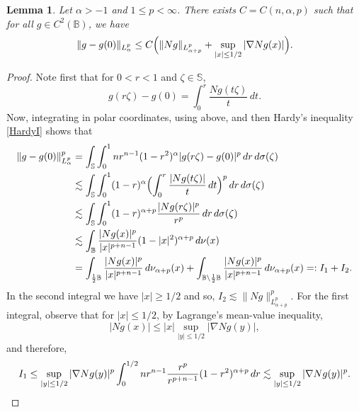 \documentclass{amsart}
\newtheorem{lemma}[theorem]{Lemma}
\theoremstyle{definition}
\theoremstyle{remark}
\begin{document}
\begin{lemma}\label{LNormal}
Let $\alpha>-1$ and $1\leq p<\infty$.
There exists $C=C(n,\alpha,p)$ such that for all $g\in C^2(\mathbb B)$,
we have
\begin{equation}\label{glessN}
\|g-g(0)\|_{L^p_{\alpha}}
\le C
\Bigl(\|Ng\|_{L^p_{\alpha+p}}
+\sup_{\vert x\vert\le 1/2}\vert\nabla Ng(x)\vert\Bigr).
\end{equation}
\end{lemma}

\begin{proof}
Note first that for $0<r<1$ and $\zeta\in\mathbb S$,
\begin{equation*}
g(r\zeta)-g(0)=\int_0^r\frac{Ng(t\zeta)}{t}\,dt.
\end{equation*}
Now, integrating in polar coordinates, using above, and then Hardy's
inequality \eqref{HardyI} shows that
\begin{align*}
\|g-g(0)\|^p_{L^p_\alpha}
&=\int_{\mathbb S}\int_0^1 nr^{n-1}(1-r^2)^\alpha\vert g(r\zeta)-g(0)\vert^p
\,dr\,d\sigma(\zeta)\\
&\lesssim \int_{\mathbb S}\int_0^1 (1-r)^\alpha
\Bigl(\int_0^r\frac{\vert Ng(t\zeta)\vert}{t}\,dt\Bigr)^p
\,dr\,d\sigma(\zeta)\\
&\lesssim\int_{\mathbb S}\int_0^1 (1-r)^{\alpha+p}
\frac{\vert Ng(r\zeta)\vert^p}{r^p}\,dr\,d\sigma(\zeta)\\
&\lesssim \int_{\mathbb B} \frac{\vert Ng(x)\vert^p}{\vert x\vert^{p+n-1}}
(1-\vert x\vert^2)^{\alpha+p}\, d\nu(x)\\
&=\int_{\frac{1}{2}\mathbb B} \frac{\vert Ng(x)\vert^p}{\vert x\vert^{p+n-1}}
\,d\nu_{\alpha+p}(x)
+\int_{\mathbb B\backslash\frac{1}{2}\mathbb B}
\frac{\vert Ng(x)\vert^p}{\vert x\vert^{p+n-1}}\,d\nu_{\alpha+p}(x)
=:I_1+I_2.
\end{align*}
In the second integral we have $\vert x\vert\ge 1/2$ and so,
$I_2\lesssim \|Ng\|^p_{L^p_{\alpha+p}}$.
For the first integral, observe that for $\vert x\vert \le 1/2$,
by Lagrange's mean-value inequality,
\begin{equation*}
\vert Ng(x)\vert\le \vert x\vert\sup_{\vert y\vert\le 1/2}\vert\nabla Ng(y)\vert,
\end{equation*}
and therefore,
\begin{equation*}
I_1\le \sup_{\vert y\vert\le 1/2}\vert\nabla Ng(y)\vert^p
\int_0^{1/2}nr^{n-1}\frac{r^p}{r^{p+n-1}}(1-r^2)^{\alpha+p}\,dr
\lesssim \sup_{\vert y\vert\le 1/2}\vert\nabla Ng(y)\vert^p.
\qedhere
\end{equation*}
\end{proof}
\end{document}
